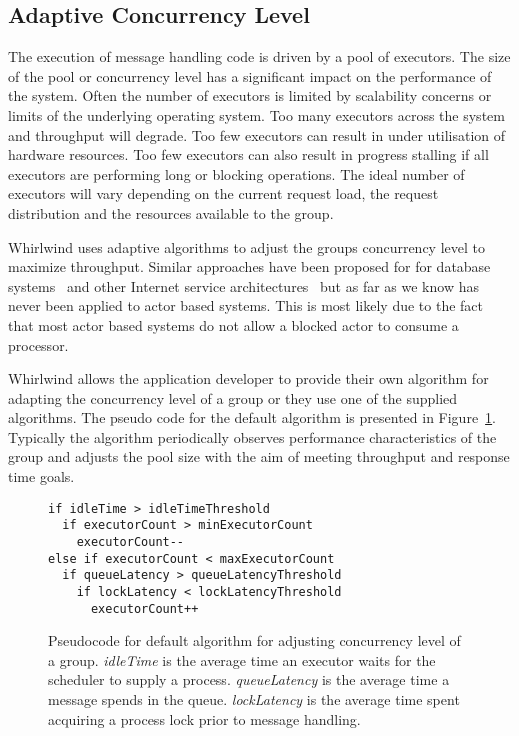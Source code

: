\documentclass[conference]{IEEEtran}
\begin{document}
\subsection{Adaptive Concurrency Level}

The execution of message handling code is driven by a pool of executors. The size of the pool or concurrency level has a significant impact on the performance of the system. Often the number of executors is limited by scalability concerns or limits of the underlying operating system. Too many executors across the system and throughput will degrade. Too few executors can result in under utilisation of hardware resources. Too few executors can also result in progress stalling if all executors are performing long or blocking operations. The ideal number of executors will vary depending on the current request load, the request distribution and the resources available to the group.

Whirlwind uses adaptive algorithms to adjust the groups concurrency level to maximize throughput. Similar approaches have been proposed for for database systems~\cite{Heiss:91:AdaptiveLoadControl} and other Internet service architectures~\cite{welsh03Adaptive} but as far as we know has never been applied to actor based systems. This is most likely due to the fact that most actor based systems do not allow a blocked actor to consume a processor.

Whirlwind allows the application developer to provide their own algorithm for adapting the concurrency level of a group or they use one of the supplied algorithms. The pseudo code for the default algorithm is presented in Figure~\ref{figure:epc}. Typically the algorithm periodically observes performance characteristics of the group and adjusts the pool size with the aim of meeting throughput and response time goals. 

\begin{figure}[ht]
\begin{verbatim}
if idleTime > idleTimeThreshold
  if executorCount > minExecutorCount
    executorCount--
else if executorCount < maxExecutorCount
  if queueLatency > queueLatencyThreshold
    if lockLatency < lockLatencyThreshold
      executorCount++
\end{verbatim}
\caption{Pseudocode for default algorithm for adjusting concurrency level of a group. \emph{idleTime} is the average time an executor waits for the scheduler to supply a process. \emph{queueLatency} is the average time a message spends in the queue. \emph{lockLatency} is the average time spent acquiring a process lock prior to message handling.}
\label{figure:epc}
\end{figure} 
\end{document}
